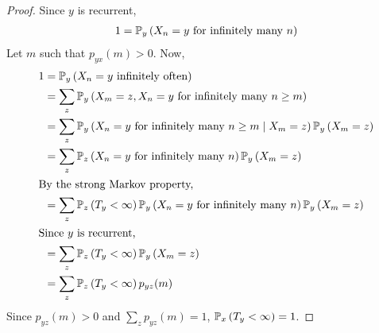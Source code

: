 \begin{proof}
	Since $y$ is recurrent,
	\begin{align*}
		1 = \mathbb{P}_{y}\left({X_n = y \text{ for infinitely many } n}\right)
	\end{align*}
	Let $m$ such that $p_{yx}(m) > 0$.
	Now,
	\begin{align*}
		1 & = \mathbb{P}_{y}\left({X_n = y \text{ infinitely often}}\right)                                                       \\
		  & = \sum_z \mathbb{P}_{y}\left({X_m = z, X_n = y \text{ for infinitely many } n \geq m}\right)                          \\
		  & = \sum_z \mathbb{P}_{y}\left({X_n = y \text{ for infinitely many } n \geq m \mid X_m = z}\right) \mathbb{P}_{y}\left({X_m = z}\right)    \\
		  & = \sum_z \mathbb{P}_{z}\left({X_n = y \text{ for infinitely many } n}\right) \mathbb{P}_{y}\left({X_m = z}\right)                        \\
		\intertext{By the strong Markov property,}
		  & = \sum_z \mathbb{P}_{z}\left({T_y < \infty}\right) \mathbb{P}_{y}\left({X_n = y \text{ for infinitely many } n}\right) \mathbb{P}_{y}\left({X_m = z}\right) \\
		\intertext{Since $y$ is recurrent,}
		  & = \sum_z \mathbb{P}_{z}\left({T_y < \infty}\right) \mathbb{P}_{y}\left({X_m = z}\right)                                                  \\
		  & = \sum_z \mathbb{P}_{z}\left({T_y < \infty}\right) p_{yz}(m)
	\end{align*}
	Since $p_{yz}(m) > 0$ and $\sum_z p_{yz}(m) = 1$, $\mathbb{P}_{x}\left({T_y < \infty}\right) = 1$.
\end{proof}